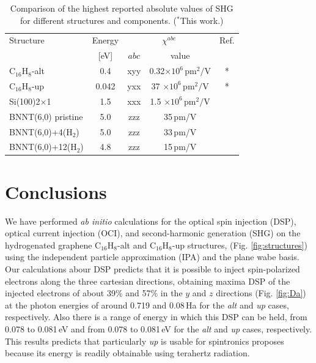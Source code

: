 \documentclass[pss]{wiley2sp} %
\begin{document}
\begin{table}[htb]%
  \sidecaption
  \begin{tabular}{lcccc}
  \hline
    Structure & \hspace{-5mm}Energy & \multicolumn{2}{c}{$\chi^{abc} $} &  Ref.\\
    \cline{3-4}
              & \hspace{-5mm}[eV]   & $abc$ & value \\
    \hline
    C$_{16}$H$_{8}$-alt   & \hspace{-5mm}0.4   & xyy   & 0.32\scriptsize{$\times 10^{6}\,\mathrm{pm}^{2}/\mathrm{V}$}  & *     \\
    C$_{16}$H$_{8}$-up    & \hspace{-5mm}0.042 & yxx   & 37  \scriptsize{$\times 10^{6}\,\mathrm{pm}^{2}/\mathrm{V}$}  & *     \\
    Si(100)2$\times$1     & \hspace{-5mm}1.5   & xxx   & 1.5 \scriptsize{$\times 10^{6}\,\mathrm{pm}^{2}/\mathrm{V}$}  & \cite{andersonPRB15}  \\
    BNNT(6,0) pristine    & \hspace{-5mm}5.0   & zzz   & 35\,\scriptsize{pm/V}  & \cite{salazarPRB14} \\
    BNNT(6,0)+4(H$_{2}$)  & \hspace{-5mm}5.0   & zzz   & 33\,\scriptsize{pm/V}  & \cite{salazarPRB14} \\
    BNNT(6,0)+12(H$_{2}$) & \hspace{-5mm}4.8   & zzz   & 15\,\scriptsize{pm/V}  & \cite{salazarPRB14} \\
  \hline
  \end{tabular}
  \caption[]{%
  Comparison of the highest reported absolute values of SHG for 
    different structures and components. ($^{*}$This work.)}
  \label{tab:shgcomp}
\end{table}

\section{Conclusions}\label{sec:conclusions}

We have performed \emph{ab initio} calculations for the optical spin injection (DSP), optical current injection (OCI), and second-harmonic generation (SHG) on the hydrogenated graphene C$_{16}$H$_{8}$-alt and C$_{16}$H$_{8}$-up structures, (Fig. \ref{fig:structures}) using the independent particle approximation (IPA) and the plane wabe basis. Our calculations abour DSP predicts that it is possible to inject spin-polarized electrons along the three cartesian directions, obtaining maxima DSP of the injected electrons of about 39\% and 57\% in the $y$ and $z$ directions  (Fig. \ref{fig:Da}) at the photon energies of around 0.719 and 0.08\,Ha  for the \emph{alt} and \emph{up} cases, respectively. Also there is a range of energy in which this DSP can be held, from 0.078 to 0.081\,eV and from 0.078 to 0.081\,eV for the \emph{alt} and \emph{up} cases, respectively. This results predicts that particularly \emph{up} is usable for spintronics proposes because its energy is readily obtainable using terahertz radiation.
\end{document}
